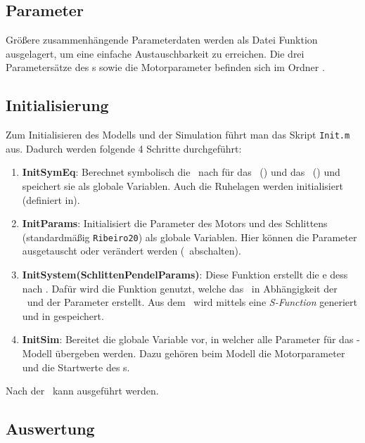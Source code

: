 \subsection{Parameter}

Größere zusammenhängende Parameterdaten werden als Datei \bzw Funktion ausgelagert, um eine einfache Austauschbarkeit zu erreichen.
Die drei Parametersätze des \spd s  sowie die Motorparameter befinden sich im Ordner .


\subsection{Initialisierung}\label{subsec:init}

Zum Initialisieren des Modells und der Simulation führt man das Skript \texttt{Init.m} aus.
Dadurch werden folgende 4 Schritte durchgeführt:
\begin{enumerate}
	\item \textbf{InitSymEq}: Berechnet symbolisch die \bwgl\ nach  für das \krs\ () und das \bss\ () und speichert sie als globale Variablen. Auch die Ruhelagen werden initialisiert (definiert in\break {}).
	\item \textbf{InitParams}: Initialisiert die Parameter des Motors und des Schlittens (standardmäßig \texttt{Ribeiro20}) als globale Variablen. Hier können die Parameter ausgetauscht oder verändert werden (\zB \crb\ abschalten).
	\item \textbf{InitSystem(SchlittenPendelParams)}: Diese Funktion erstellt die \zrm e des\break \spds s nach . Dafür wird die Funktion \mbox{} genutzt, welche das \zrm\ in Abhängigkeit der \bwgl\ und der Parameter erstellt. Aus dem \krs\ wird mittels  eine \emph{S-Function} generiert und in  gespeichert.
	\item \textbf{InitSim}: Bereitet die globale Variable  vor, in welcher alle Parameter für das \sm-Modell übergeben werden. Dazu gehören beim Modell die Motorparameter und die Startwerte des \spds s.
\end{enumerate}
Nach der \init\ kann  ausgeführt werden.


\subsection{Auswertung}\label{subsec:ausw}

